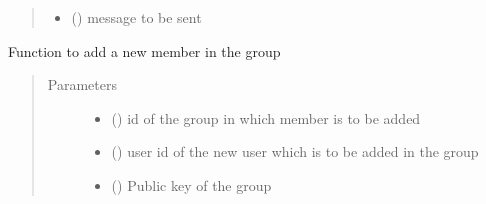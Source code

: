 \documentclass[letterpaper,10pt,english]{sphinxmanual}
\begin{document}
\begin{fulllineitems}
\begin{fulllineitems}
\begin{quote}
\begin{description}
\begin{itemize}
\item {} 
 () \textendash{} message to be sent

\end{itemize}

\end{description}\end{quote}

\end{fulllineitems}


\begin{fulllineitems}
\label{\detokenize{Message:Message.Message._add_grp_mem}}
Function to add a new member in the group
\begin{quote}\begin{description}
\item[{Parameters}] \leavevmode\begin{itemize}
\item {} 
 () \textendash{} id of the group in which member is to be added

\item {} 
 () \textendash{} user id of the new user which is to be added in the group

\item {} 
 () \textendash{} Public key of the group

\end{itemize}

\end{description}\end{quote}

\end{fulllineitems}



\end{fulllineitems}
\end{document}
